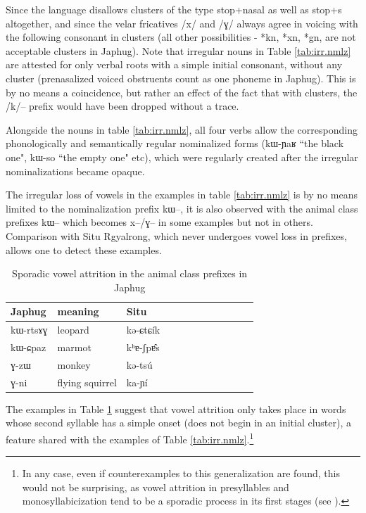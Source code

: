 \documentclass[oldfontcommands,oneside,a4paper,11pt]{article}
\newcommand{\ipa}[1]{{\phon \mbox{#1}}} %
\begin{document}
Since the language  disallows  clusters of the type stop+nasal as well as stop+s altogether, and since the velar fricatives /x/ and /ɣ/ always agree in voicing with the following consonant in clusters (all other possibilities - *kn, *xn, *gn, are not acceptable clusters in Japhug). Note that irregular nouns in Table \ref{tab:irr.nmlz} are attested for only verbal roots with a simple initial consonant, without any cluster (prenasalized voiced obstruents count as one phoneme in Japhug). This is by no means a coincidence, but rather an effect of the fact that with clusters, the /k/-- prefix would have been dropped without a trace.


Alongside the nouns in table \ref{tab:irr.nmlz}, all four verbs allow the corresponding phonologically and semantically regular nominalized forms (\ipa{kɯ-ɲaʁ} ``the black one", \ipa{kɯ-so} ``the empty one" etc), which were regularly created after the irregular nominalizations became opaque. 

The irregular loss of vowels in the examples in table \ref{tab:irr.nmlz} is by no means limited to the nominalization prefix \ipa{kɯ}--, it is also observed with the animal class prefixes \ipa{kɯ}-- which becomes \ipa{x--}/\ipa{ɣ--}  in some examples but not in others. Comparison with Situ Rgyalrong, which never undergoes vowel loss in prefixes, allows one to detect these examples.

\begin{table}[H]
\caption{Sporadic vowel attrition in the animal class prefixes in Japhug} \label{tab:animal} \centering
\begin{tabular}{llllllllllll}
\toprule
Japhug & meaning & Situ     \\
\midrule
\ipa{kɯ-rtsɤɣ} & leopard & \ipa{kə-ɕtɕík} \\
\ipa{kɯ-ɕpaz} & marmot & \ipa{kʰɐ-ʃpɐ̂s} \\
\midrule
\ipa{ɣ-zɯ} & monkey & \ipa{kə-tsú}\\
\ipa{ɣ-ni} & flying squirrel & \ipa{ka-ɲí}\\
\bottomrule
\end{tabular}
\end{table}
The examples in Table \ref{tab:animal} suggest that vowel attrition only takes place in words whose second syllable has a simple onset (does not begin in an initial cluster), a feature shared with the examples of Table \ref{tab:irr.nmlz}.\footnote{In any case, even if counterexamples to this generalization are found, this would not be surprising, as vowel attrition in presyllables and monosyllabicization tend to be a sporadic process in its first stages (see \citealt{michaud12mono}).}
\end{document}

